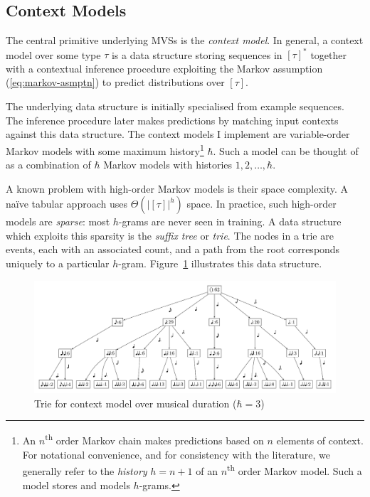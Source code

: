 \documentclass[12pt,a4paper,twoside,openright]{report}
\begin{document}
\subsection{Context Models}\label{sec:ctx-model-prep}

The central primitive underlying MVSs is the \emph{context model}. In general,
a context model over some type $\tau$ is a data structure storing sequences in
$[\tau]^*$ together with a contextual inference procedure exploiting the Markov
assumption (\ref{eq:markov-asmptn}) to predict distributions over $[\tau]$. 

The underlying data structure is initially specialised from example sequences.
The inference procedure later makes predictions by matching input contexts
against this data structure. The context models I implement are variable-order
Markov models with some maximum history\footnote{ An $n$\textsuperscript{th}
  order Markov chain makes predictions based on $n$ elements of context. For
  notational convenience, and for consistency with the literature, we generally
  refer to the \emph{history} $h = n+1$ of an $n$\textsuperscript{th} order
Markov model.  Such a model stores and models $h$-grams.  } $\hbar$. Such a
model can be thought of as a combination of $\hbar$ Markov models with histories
$1,2,\ldots,\hbar$. 

A known problem with high-order Markov models is their space complexity. A naïve
tabular approach uses $\Theta(|[\tau]|^h)$ space.  In practice, such high-order
models are \emph{sparse}: most $h$-grams are never seen in training. A data
structure which exploits this sparsity is the \emph{suffix tree} or \emph{trie}.
The nodes in a trie are events, each with an associated count, and a path from
the root corresponds uniquely to a particular $h$-gram.
Figure~\ref{fig:dur-trie} illustrates this data structure.

\begin{figure}[H]
\centering
\includegraphics[width=\linewidth]{figs/duration_vp.pdf}
\caption{Trie for context model over musical duration ($\hbar = 3$)}
\label{fig:dur-trie}
\end{figure}
\end{document}
